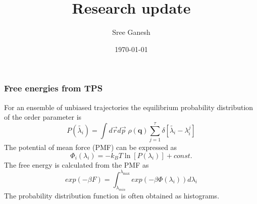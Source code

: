 \documentclass[a4paper,8pt]{beamer}
\title[Free energy]{Research update}
\date{\today}
\author{Sree Ganesh}
\institute[U of A]{Schwartz Group \\ University of Arizona}
\begin{document}
\maketitle
%
%
%
%
\begin{frame}
\frametitle{Free energies from TPS}
For an ensemble of unbiased trajectories 
the equilibrium probability distribution of the order parameter is  
\begin{equation}
P(\tilde{\lambda_i}) = \int d\vec{r}d\vec{p}\;\rho(\textbf{q})\sum^{\tau}_{j=1}\delta\left[\tilde{\lambda_i}-\lambda^j_i\right] \nonumber 
\end{equation}
\pause
The potential of mean force (PMF) can be expressed as 
\begin{equation}
\Phi_i(\lambda_i) = -k_BT\ln[P(\lambda_i)] + const. \nonumber 
\end{equation}
The free energy is calculated from the PMF as
\begin{equation}
exp(-\beta F) =\int^{\lambda_{\max}}_{\lambda_{min}} exp(-\beta\Phi(\lambda_i))d\lambda_i \nonumber 
\end{equation}
\pause
The probability distribution function is often obtained as histograms.
\end{frame}
%
\end{document}
